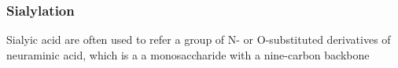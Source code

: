 \subsubsection {Sialylation}
Sialyic acid are often used to refer a group of N- or O-substituted derivatives of neuraminic acid, which is a a monosaccharide with a nine-carbon backbone
